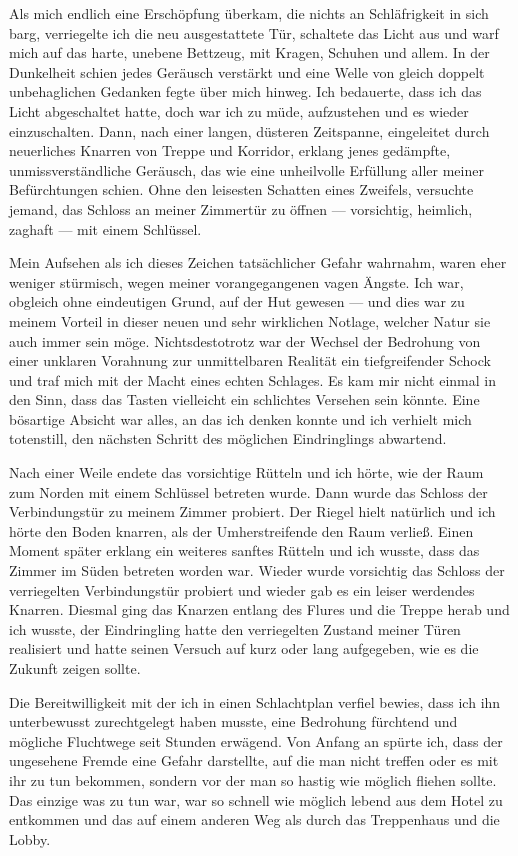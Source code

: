 Als mich endlich eine Erschöpfung überkam, die nichts an Schläfrigkeit in sich barg, verriegelte ich die neu ausgestattete Tür, schaltete das Licht aus und warf mich auf das harte, unebene Bettzeug, mit Kragen, Schuhen und allem. In der Dunkelheit schien jedes Geräusch verstärkt und eine Welle von gleich doppelt unbehaglichen Gedanken fegte über mich hinweg. Ich bedauerte, dass ich das Licht abgeschaltet hatte, doch war ich zu müde, aufzustehen und es wieder einzuschalten. Dann, nach einer langen, düsteren Zeitspanne, eingeleitet durch neuerliches Knarren von Treppe und Korridor, erklang jenes gedämpfte, unmissverständliche Geräusch, das wie eine unheilvolle Erfüllung aller meiner Befürchtungen schien. Ohne den leisesten Schatten eines Zweifels, versuchte jemand, das Schloss an meiner Zimmertür zu öffnen --- vorsichtig, heimlich, zaghaft --- mit einem Schlüssel.

Mein Aufsehen als ich dieses Zeichen tatsächlicher Gefahr wahrnahm, waren eher weniger stürmisch, wegen meiner vorangegangenen vagen Ängste. Ich war, obgleich ohne eindeutigen Grund, auf der Hut gewesen --- und dies war zu meinem Vorteil in dieser neuen und sehr wirklichen Notlage, welcher Natur sie auch immer sein möge. Nichtsdestotrotz war der Wechsel der Bedrohung von einer unklaren Vorahnung zur unmittelbaren Realität ein tiefgreifender Schock und traf mich mit der Macht eines echten Schlages. Es kam mir nicht einmal in den Sinn, dass das Tasten vielleicht ein schlichtes Versehen sein könnte. Eine bösartige Absicht war alles, an das ich denken konnte und ich verhielt mich totenstill, den nächsten Schritt des möglichen Eindringlings abwartend.

Nach einer Weile endete das vorsichtige Rütteln und ich hörte, wie der Raum zum Norden mit einem Schlüssel betreten wurde. Dann wurde das Schloss der Verbindungstür zu meinem Zimmer probiert. Der Riegel hielt natürlich und ich hörte den Boden knarren, als der Umherstreifende den Raum verließ. Einen Moment später erklang ein weiteres sanftes Rütteln und ich wusste, dass das Zimmer im Süden betreten worden war. Wieder wurde vorsichtig das Schloss der verriegelten Verbindungstür probiert und wieder gab es ein leiser werdendes Knarren. Diesmal ging das Knarzen entlang des Flures und die Treppe herab und ich wusste, der Eindringling hatte den verriegelten Zustand meiner Türen realisiert und hatte seinen Versuch auf kurz oder lang aufgegeben, wie es die Zukunft zeigen sollte.

Die Bereitwilligkeit mit der ich in einen Schlachtplan verfiel bewies, dass ich ihn unterbewusst zurechtgelegt haben musste, eine Bedrohung fürchtend und mögliche Fluchtwege seit Stunden erwägend. Von Anfang an spürte ich, dass der ungesehene Fremde eine Gefahr darstellte, auf die man nicht treffen oder es mit ihr zu tun bekommen, sondern vor der man so hastig wie möglich fliehen sollte. Das einzige was zu tun war, war so schnell wie möglich lebend aus dem Hotel zu entkommen und das  auf einem anderen Weg als durch das Treppenhaus und die Lobby.

